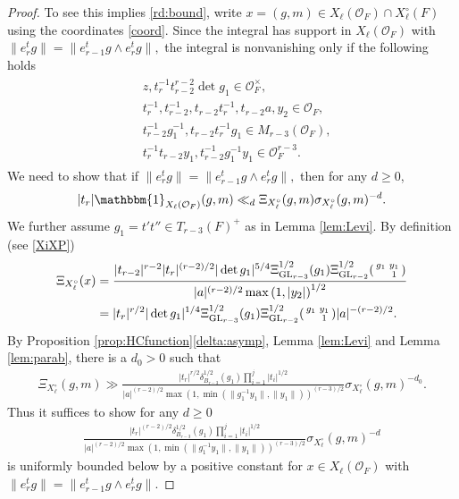 \documentclass[12pt]{amsart}
\theoremstyle{remark}
\numberwithin{equation}{section}
\newcommand{\GL}{\mathrm{GL}}
\newcommand{\OO}{\mathcal{O}}
\theoremstyle{definition}
\newenvironment{psmatrix}
  {\left(\begin{smallmatrix}}
  {\end{smallmatrix}\right)}
\numberwithin{equation}{subsection}
\newcommand{\one}{\mathbbm{1}}
\newcommand{\norm}[1]{\lVert#1\rVert}
\begin{document}
\begin{proof}
To see this implies \eqref{rd:bound}, write $x=(g,m)\in X_\ell(\mathcal{O}_F)\cap X_\ell^\circ(F)$ using the coordinates \eqref{coord}. Since the integral has support in $X_\ell(\OO_F)$ with $\norm{e_{r}^tg}=\norm{e_{r-1}^tg\wedge e_{r}^tg},$ the integral is nonvanishing only if the following holds
\begin{align} \label{int:constraints} \begin{split}
    &z,t_r^{-1}t_{r-2}^{r-2}\det g_1\in \OO_F^\times,\\
    &t_r^{-1},t_{r-2}^{-1}, t_{r-2}t_r^{-1},t_{r-2}a,y_2\in \mathcal{O}_F,\\
    &t_{r-2}^{-1}g_1^{-1}, t_{r-2}t_r^{-1}g_1\in M_{r-3}(\mathcal{O}_F),\\
    &t_{r}^{-1}t_{r-2}y_1,t_{r-2}^{-1}g_1^{-1}y_1\in \mathcal{O}_F^{r-3}. \end{split}
\end{align}
 We need to show that if $\norm{e_{r}^tg}=\norm{e_{r-1}^tg\wedge e_{r}^tg},$ then for any $d\ge 0$,
\begin{align*}
|t_r|\one_{X_\ell(\OO_F)}(g,m)\ll_d  \Xi_{X_\ell^\circ}(g,m)\sigma_{X_\ell^\circ}(g,m)^{-d}.
\end{align*}
We further assume $g_1=t't''\in T_{r-3}(F)^+$ as in Lemma \ref{lem:Levi}. By definition (see \eqref{XiXP})
    \begin{align*}  
\Xi_{X_\ell^\circ}(x)&=\frac{|t_{r-2}|^{r-2}|t_r|^{(r-2)/2}|\det g_1|^{5/4}\Xi^{1/2}_{\GL_{r-3}}(g_1)\Xi_{\GL_{r-2}}^{1/2}\begin{psmatrix}
        g_1 &y_1 \\
          & 1
    \end{psmatrix}}{|a|^{(r-2)/2}\max\left(1,|y_2|\right)^{1/2}}\\
&=|t_r|^{r/2}|\det g_1|^{1/4}\Xi^{1/2}_{\GL_{r-3}}(g_1)\Xi_{\GL_{r-2}}^{1/2}\begin{psmatrix}
        g_1 &y_1 \\
          & 1
    \end{psmatrix}|a|^{-(r-2)/2}.
\end{align*}
By Proposition \ref{prop:HCfunction}\ref{delta:asymp}, Lemma \ref{lem:Levi} and Lemma \ref{lem:parab}, there is a $d_0>0$ such that
\begin{align*}
    \Xi_{X_\ell^\circ}(g,m)\gg \frac{|t_r|^{r/2}\delta_{B_{r-3}}^{1/2}(g_1)\prod_{i=1}^j |t_i|^{1/2}}{|a|^{(r-2)/2}\max\left(1,\min\left(\norm{g_1^{-1}y_1},\norm{y_1}\right)\right)^{(r-3)/2}}\sigma_{X_\ell^\circ}(g,m)^{-d_0}.
\end{align*}
Thus it suffices to show for any $d\ge 0$
\begin{align}\label{eq:goal}
     \frac{|t_r|^{(r-2)/2}\delta_{B_{r-3}}^{1/2}(g_1)\prod_{i=1}^j |t_i|^{1/2}}{|a|^{(r-2)/2}\max\left(1,\min\left(\norm{g_1^{-1}y_1},\norm{y_1}\right)\right)^{(r-3)/2}}\sigma_{X_\ell^\circ}(g,m)^{-d}
\end{align}
is uniformly bounded below by a positive constant for $x\in X_\ell(\OO_F)$ with $\norm{e_{r}^tg}=\norm{e_{r-1}^tg\wedge e_{r}^tg}$.


\end{proof}
\end{document}
